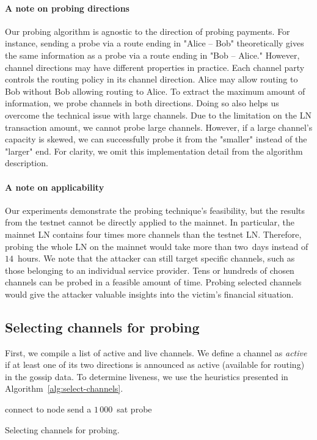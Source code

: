 \paragraph{A note on probing directions}
Our probing algorithm is agnostic to the direction of probing payments.
For instance, sending a probe via a route ending in "Alice -- Bob" theoretically gives the same information as a probe via a route ending in "Bob -- Alice."
However, channel directions may have different properties in practice.
Each channel party controls the routing policy in its channel direction.
Alice may allow routing to Bob without Bob allowing routing to Alice.
To extract the maximum amount of information, we probe channels in both directions.
Doing so also helps us overcome the technical issue with large channels.
Due to the limitation on the LN transaction amount, we cannot probe large channels.
However, if a large channel's capacity is skewed, we can successfully probe it from the "smaller" instead of the "larger" end.
For clarity, we omit this implementation detail from the algorithm description.

\paragraph{A note on applicability}
Our experiments demonstrate the probing technique's feasibility, but the results from the testnet cannot be directly applied to the mainnet.
In particular, the mainnet LN contains four times more channels than the testnet LN\@.
Therefore, probing the whole LN on the mainnet would take more than two~days instead of~$14$~hours.
We note that the attacker can still target specific channels, such as those belonging to an individual service provider.
Tens or hundreds of chosen channels can be probed in a feasible amount of time.
Probing selected channels would give the attacker valuable insights into the victim's financial situation.


\subsection{Selecting channels for probing}

First, we compile a list of active and live channels.
We define a channel as \textit{active} if at least one of its two directions is announced as active (available for routing) in the gossip data.
To determine liveness, we use the heuristics presented in Algorithm~\ref{alg:select-channels}.

\begin{algorithm}
	 {
		connect to node\;
	}
	 {
		send a $1\,000$~sat probe\;
	}
	\caption{Selecting channels for probing.}
	\label{alg:select-channels}
\end{algorithm}

